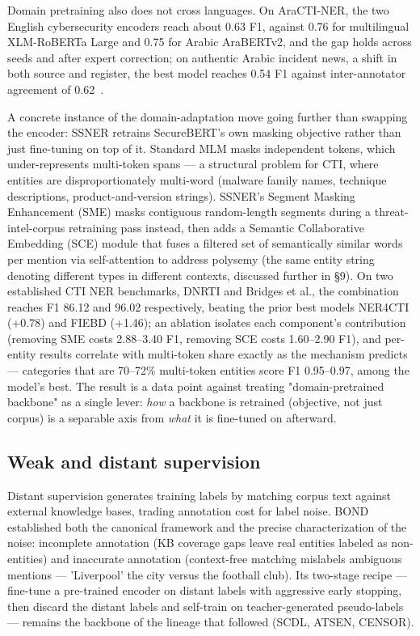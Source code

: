 \documentclass[11pt]{article}
\begin{document}
Domain pretraining also does not cross languages. On AraCTI-NER, the two English cybersecurity encoders reach about 0.63 F1, against 0.76 for multilingual XLM-RoBERTa Large and 0.75 for Arabic AraBERTv2, and the gap holds across seeds and after expert correction; on authentic Arabic incident news, a shift in both source and register, the best model reaches 0.54 F1 against inter-annotator agreement of 0.62~\citep{alghamdi2026aracti}.

A concrete instance of the domain-adaptation move going further than swapping the encoder: SSNER retrains SecureBERT's own masking objective rather than just fine-tuning on top of it. Standard MLM masks independent tokens, which under-represents multi-token spans — a structural problem for CTI, where entities are disproportionately multi-word (malware family names, technique descriptions, product-and-version strings). SSNER's Segment Masking Enhancement (SME) masks contiguous random-length segments during a threat-intel-corpus retraining pass instead, then adds a Semantic Collaborative Embedding (SCE) module that fuses a filtered set of semantically similar words per mention via self-attention to address polysemy (the same entity string denoting different types in different contexts, discussed further in §9). On two established CTI NER benchmarks, DNRTI and Bridges et al., the combination reaches F1 86.12 and 96.02 respectively, beating the prior best models NER4CTI (+0.78) and FIEBD (+1.46); an ablation isolates each component's contribution (removing SME costs 2.88–3.40 F1, removing SCE costs 1.60–2.90 F1), and per-entity results correlate with multi-token share exactly as the mechanism predicts — categories that are 70–72\% multi-token entities score F1 0.95–0.97, among the model's best. The result is a data point against treating "domain-pretrained backbone" as a single lever: \emph{how} a backbone is retrained (objective, not just corpus) is a separable axis from \emph{what} it is fine-tuned on afterward.

\subsection{Weak and distant supervision}

Distant supervision generates training labels by matching corpus text against external knowledge bases, trading annotation cost for label noise. BOND~\citep{liang2020bond} established both the canonical framework and the precise characterization of the noise: incomplete annotation (KB coverage gaps leave real entities labeled as non-entities) and inaccurate annotation (context-free matching mislabels ambiguous mentions — 'Liverpool' the city versus the football club). Its two-stage recipe — fine-tune a pre-trained encoder on distant labels with aggressive early stopping, then discard the distant labels and self-train on teacher-generated pseudo-labels — remains the backbone of the lineage that followed (SCDL, ATSEN, CENSOR).
\end{document}
